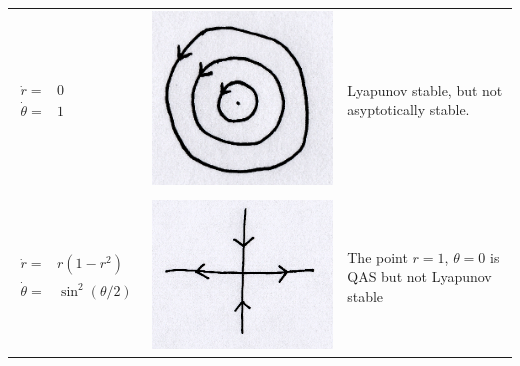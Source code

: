 \documentclass{article}
\begin{document}
\begin{tabular}{m{3cm} m{4cm} m{9cm}  } 
$\begin{array}{lr} 
\dot{r} = & 0 \\
\dot{\theta} = & 1
\end{array}$ &
\includegraphics[scale = 0.15]{fig11.png}  & 
Lyapunov stable, but not asyptotically stable.
\\
\\
$\begin{array}{lr} 
\dot{r} = & r(1-r^2) \\
\dot{\theta} = & \sin^2(\theta/2)
\end{array}$ &
\includegraphics[scale = 0.15]{fig14.png}  & 
The point $r=1$, $\theta = 0$ is QAS but not Lyapunov stable
\end{tabular}
\end{document}
